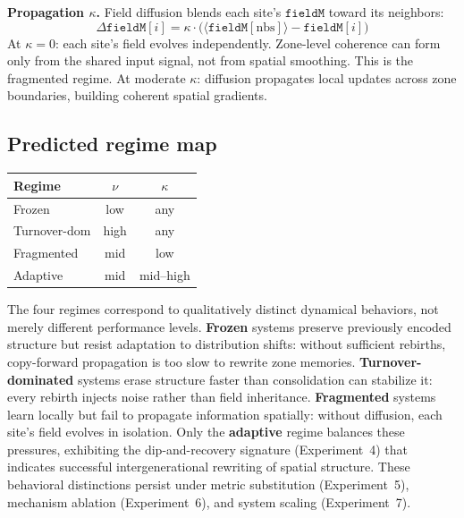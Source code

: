 \documentclass[11pt]{article}
\theoremstyle{remark}
\begin{document}
\textbf{Propagation $\kappa$.} Field diffusion blends each site's $\mathtt{fieldM}$
toward its neighbors:
\begin{equation}
  \Delta \mathtt{fieldM}[i] = \kappa \cdot \bigl(\langle \mathtt{fieldM}[\text{nbs}]\rangle
  - \mathtt{fieldM}[i]\bigr)
\end{equation}
At $\kappa = 0$: each site's field evolves independently. Zone-level coherence
can form only from the shared input signal, not from spatial smoothing. This is
the fragmented regime. At moderate $\kappa$: diffusion propagates local updates
across zone boundaries, building coherent spatial gradients.

\subsection{Predicted regime map}

\begin{center}
\begin{tabular}{lcc}
\toprule
Regime     & $\nu$ & $\kappa$ \\
\midrule
Frozen      & low   & any   \\
Turnover-dom & high  & any   \\
Fragmented  & mid   & low   \\
Adaptive    & mid   & mid--high \\
\bottomrule
\end{tabular}
\end{center}

The four regimes correspond to qualitatively distinct dynamical behaviors, not
merely different performance levels. \textbf{Frozen} systems preserve previously
encoded structure but resist adaptation to distribution shifts: without
sufficient rebirths, copy-forward propagation is too slow to rewrite zone
memories. \textbf{Turnover-dominated} systems erase structure faster than
consolidation can stabilize it: every rebirth injects noise rather than field
inheritance. \textbf{Fragmented} systems learn locally but fail to propagate
information spatially: without diffusion, each site's field evolves in
isolation. Only the \textbf{adaptive} regime balances these pressures, exhibiting
the dip-and-recovery signature (Experiment~4) that indicates successful
intergenerational rewriting of spatial structure. These behavioral distinctions
persist under metric substitution (Experiment~5), mechanism ablation
(Experiment~6), and system scaling (Experiment~7).
\end{document}
